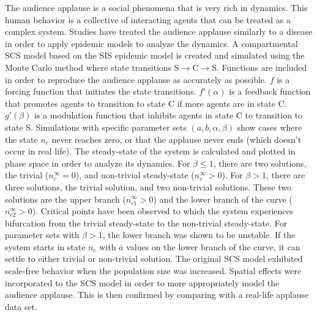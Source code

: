 The audience applause is a social phenomena that is very rich in dynamics. 
This human behavior is a collective of interacting agents that can be treated as a complex system.
Studies have treated the audience applause similarly to a disease in order to apply epidemic models to analyze the dynamics.
A compartmental SCS model based on the SIS epidemic model is created and simulated using the Monte Carlo method where state transitions $\mathrm{S} \rightarrow \mathrm{C} \rightarrow \mathrm{S}$.
Functions are included in order to reproduce the audience applause as accurately as possible.
$f$ is a forcing function that initiates the state transitions.
$f'(\alpha)$ is a feedback function that promotes agents to transition to state C if more agents are in state C.
$g'(\beta)$ is a modulation function that inhibits agents in state C to transition to state S.
Simulations with specific parameter sets $(a,b,\alpha,\beta)$ show cases where the state $n_{c}$ never reaches zero, or that the applause never ends (which doesn't occur in real life).
The steady-state of the system is calculated and plotted in phase space in order to analyze its dynamics.
For $\beta \leq 1$, there are two solutions, the trivial ($n^\infty_{c}=0$), and non-trivial steady-state ($n^\infty_{c}>0$).
For $\beta > 1$, there are three solutions, the trivial solution, and two non-trivial solutions.
These two solutions are the upper branch ($n^\infty_{c1}>0$) and the lower branch of the curve ($n^\infty_{c2}>0$).
Critical points have been observed to which the system experiences bifurcation from the trivial steady-state to the non-trivial steady-state.
For parameter sets with $\beta >1$, the lower branch was shown to be unstable.
If the system starts in state $n_{c}$ with $\bar{a}$ values on the lower branch of the curve, it can settle to either trivial or non-trivial solution.
The original SCS model exhibited scale-free behavior when the population size was increased.
Spatial effects were incorporated to the SCS model in order to more appropriately model the audience applause.
This is then confirmed by comparing with a real-life applause data set.








